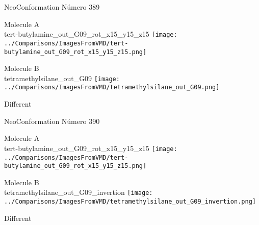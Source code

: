  \newpage

\vtab[-3cm]
\begin{center}
{\large NeoConformation \tab Número 389}
\end{center}
\begin{multicols}{2}
\begin{center}
Molecule A \\ 
tert-butylamine\_out\_G09\_rot\_x15\_y15\_z15
\texttt{[image: ../Comparisons/ImagesFromVMD/tert-butylamine\_out\_G09\_rot\_x15\_y15\_z15.png]}
\\
\vtab

\columnbreak
Molecule B \\ 
tetramethylsilane\_out\_G09
\texttt{[image: ../Comparisons/ImagesFromVMD/tetramethylsilane\_out\_G09.png]}
\\
\vtab


\end{center}
\end{multicols}
\begin{center}
\textcolor{NavyBlue}{\Large Different}
\end{center}

 \newpage

\vtab[-3cm]
\begin{center}
{\large NeoConformation \tab Número 390}
\end{center}
\begin{multicols}{2}
\begin{center}
Molecule A \\ 
tert-butylamine\_out\_G09\_rot\_x15\_y15\_z15
\texttt{[image: ../Comparisons/ImagesFromVMD/tert-butylamine\_out\_G09\_rot\_x15\_y15\_z15.png]}
\\
\vtab

\columnbreak
Molecule B \\ 
tetramethylsilane\_out\_G09\_invertion
\texttt{[image: ../Comparisons/ImagesFromVMD/tetramethylsilane\_out\_G09\_invertion.png]}
\\
\vtab


\end{center}
\end{multicols}
\begin{center}
\textcolor{NavyBlue}{\Large Different}
\end{center}

 \newpage

